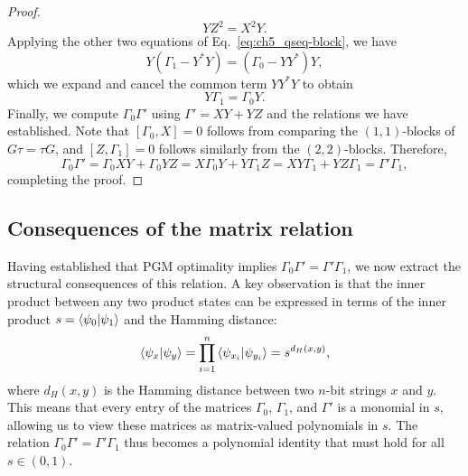 \begin{proof}
    \begin{equation}
        YZ^2 = X^2 Y.
    \end{equation}
    Applying the other two equations of Eq.~\eqref{eq:ch5_qseq-block}, we have
    \begin{equation}
        Y(\Gamma_1 - Y^{*}Y) = (\Gamma_0 - YY^{*})Y,
    \end{equation}
    which we expand and cancel the common term $YY^{*}Y$ to obtain
    \begin{equation}\label{eq:ch5_qseq-YG}
        Y\Gamma_1 = \Gamma_0 Y.
    \end{equation}
    Finally, we compute $\Gamma_0\Gamma'$ using $\Gamma' = XY + YZ$ and the relations we have established.
    Note that $[\Gamma_0, X] = 0$ follows from comparing the $(1,1)$-blocks of $G\tau = \tau G$, and $[Z, \Gamma_1] = 0$ follows similarly from the $(2,2)$-blocks.
    Therefore,
    \begin{equation}
        \Gamma_0 \Gamma' = \Gamma_0 XY + \Gamma_0 YZ
        = X\Gamma_0 Y + Y\Gamma_1 Z = XY\Gamma_1 + YZ\Gamma_1 = \Gamma' \Gamma_1,
    \end{equation}
    completing the proof.
\end{proof}


\subsection{Consequences of the matrix relation}

Having established that PGM optimality implies $\Gamma_0 \Gamma' = \Gamma' \Gamma_1$, we now extract the structural consequences of this relation.
A key observation is that the inner product between any two product states can be expressed in terms of the inner product $s = \braket{\psi_0}{\psi_1}$ and the Hamming distance:
\begin{equation}\label{eq:ch5_qseq-inner-product-hamming}
    \braket{\psi_x}{\psi_y} = \prod_{i=1}^n \braket{\psi_{x_i}}{\psi_{y_i}} = s^{d_H(x,y)},
\end{equation}
where $d_H(x,y)$ is the Hamming distance between two $n$-bit strings $x$ and $y$.
This means that every entry of the matrices $\Gamma_0$, $\Gamma_1$, and $\Gamma'$ is a monomial in $s$, allowing us to view these matrices as matrix-valued polynomials in $s$.
The relation $\Gamma_0\Gamma' = \Gamma'\Gamma_1$ thus becomes a polynomial identity that must hold for all $s \in (0,1)$.

